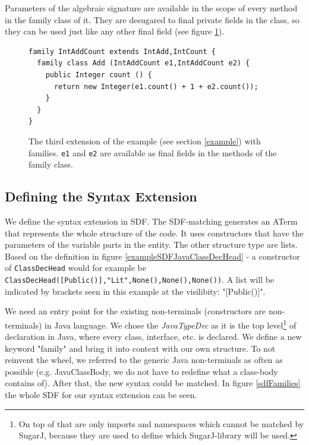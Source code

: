\documentclass{report}
\begin{document}
Parameters of the algebraic signature are available in the scope of every method in the family class of it. They are desugared to final private fields in the class, so they can be used just like any other final field (see figure \ref{thirdExtensionFamily}).

\begin{figure}[h]
\begin{lstlisting}[language=exprExt]
family IntAddCount extends IntAdd,IntCount {
  family class Add (IntAddCount e1,IntAddCount e2) {
    public Integer count () {
      return new Integer(e1.count() + 1 + e2.count());
    }
  }
}
\end{lstlisting}
\caption{The third extension of the example (see section \ref{example}) with families. \lstinline{e1} and \lstinline{e2} are available as final fields in the methods of the family class.}
\label{thirdExtensionFamily}
\end{figure}


\subsection{Defining the Syntax Extension}
We define the syntax extension in SDF. The SDF-matching generates an ATerm that represents the whole structure of the code. It uses constructors that have the parameters of the variable parts in the entity. The other structure type are lists. Based on the definition in figure \ref{exampleSDFJavaClassDecHead} - a constructor of \lstinline{ClassDecHead} would for example be \lstinline[breaklines=false,morekeywords={field1,field2,field3,annot,typeParams,result,methodName,params,throws,body,rest},keywordstyle=\bfseries\color{OliveGreen}]{ClassDecHead([Public()],"Lit",None(),None(),None())}. A list will be indicated by brackets seen in this example at the visilibity: "[Public()]".

We need an entry point for the existing non-terminals (constructors are non-terminals) in Java language. We chose the \emph{JavaTypeDec} as it is the top level\footnote{On top of that are only imports and namespaces which cannot be matched by SugarJ, because they are used to define which SugarJ-library will be used.} of declaration in Java, where every class, interface, etc. is declared. We define a new keyword "family" and bring it into context with our own structure. To not reinvent the wheel, we referred to the generic Java non-terminals as often as possible (e.g. JavaClassBody, we do not have to redefine what a class-body contains of). After that, the new syntax could be matched. In figure \ref{sdfFamilies} the whole SDF for our syntax extension can be seen.
\end{document}
